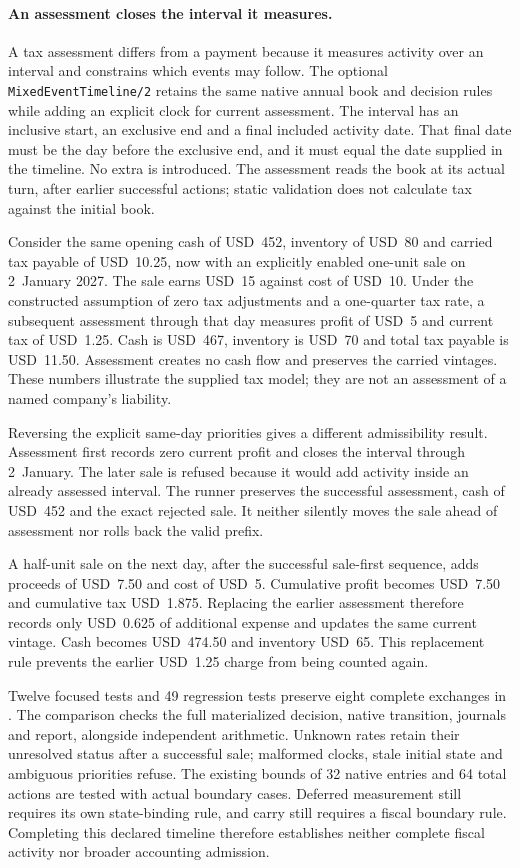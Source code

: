 \paragraph{An assessment closes the interval it measures.}
A tax assessment differs from a payment because it measures activity over an
interval and constrains which events may follow. The optional
\texttt{MixedEventTimeline/2} retains the same native annual book and decision
rules while adding an explicit clock for current assessment. The interval
has an inclusive start, an exclusive end and a final included activity date.
That final date must be the day before the exclusive end, and it must equal
the date supplied in the timeline. No extra  is introduced.
The assessment reads the book at its actual turn, after earlier successful
actions; static validation does not calculate tax against the initial book.

Consider the same opening cash of USD~452, inventory of USD~80 and carried tax
payable of USD~10.25, now with an explicitly enabled one-unit sale on
2~January 2027. The sale earns USD~15 against cost of USD~10. Under the
constructed assumption of zero tax adjustments and a one-quarter tax rate,
a subsequent assessment through that day measures profit of USD~5 and current
tax of USD~1.25. Cash is USD~467, inventory is USD~70 and total tax payable is
USD~11.50. Assessment creates no cash flow and preserves the carried vintages.
These numbers illustrate the supplied tax model; they are not an assessment
of a named company's liability.

Reversing the explicit same-day priorities gives a different admissibility
result. Assessment first records zero current profit and closes the interval
through 2~January. The later sale is refused because it would add activity
inside an already assessed interval. The runner preserves the successful
assessment, cash of USD~452 and the exact rejected sale. It neither silently
moves the sale ahead of assessment nor rolls back the valid prefix.

A half-unit sale on the next day, after the successful sale-first sequence,
adds proceeds of USD~7.50 and cost of USD~5. Cumulative profit becomes USD~7.50
and cumulative tax USD~1.875. Replacing the earlier assessment therefore
records only USD~0.625 of additional expense and updates the same current
vintage. Cash becomes USD~474.50 and inventory USD~65. This replacement rule
prevents the earlier USD~1.25 charge from being counted again.

Twelve focused tests and 49 regression tests preserve eight complete exchanges
in . The comparison
checks the full materialized decision, native transition, journals and report,
alongside independent arithmetic. Unknown rates retain their unresolved
status after a successful sale; malformed clocks, stale initial state and
ambiguous priorities refuse. The existing bounds of 32 native entries and
64 total actions are tested with actual boundary cases. Deferred measurement
still requires its own state-binding rule, and carry still requires a fiscal
boundary rule. Completing this declared timeline therefore establishes neither
complete fiscal activity nor broader accounting admission.
